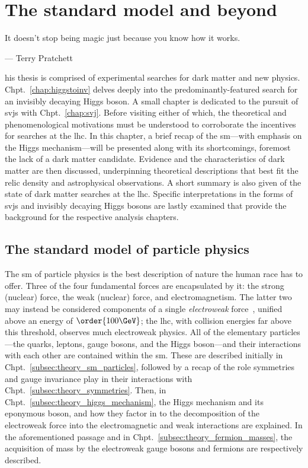 \chapter{The standard model and beyond}
\label{chap:theory}

\epigraph{It doesn’t stop being magic just because you know how it works.}{--- Terry Pratchett}

his thesis is comprised of experimental searches for dark matter and new physics. Chpt.~\ref{chap:higgstoinv} delves deeply into the predominantly-featured search for an invisibly decaying Higgs boson. A small chapter is dedicated to the pursuit of \glspl{svj} with Chpt.~\ref{chap:svj}. Before visiting either of which, the theoretical and phenomenological motivations must be understood to corroborate the incentives for searches at the \acrlong{lhc}. In this chapter, a brief recap of the \acrlong{sm}---with emphasis on the Higgs mechanism---will be presented along with its shortcomings, foremost the lack of a dark matter candidate. Evidence and the characteristics of dark matter are then discussed, underpinning theoretical descriptions that best fit the relic density and astrophysical observations. A short summary is also given of the state of dark matter searches at the \acrshort{lhc}. Specific interpretations in the forms of \glspl{svj} and invisibly decaying Higgs bosons are lastly examined that provide the background for the respective analysis chapters.




\section{The standard model of particle physics}
\label{sec:theory_standardmodel}

The \acrlong{sm} of particle physics is the best description of nature the human race has to offer. Three of the four fundamental forces are encapsulated by it: the strong (nuclear) force, the weak (nuclear) force, and electromagnetism. The latter two may instead be considered components of a single \emph{electroweak} force~\cite{GLASHOW1961579,PhysRevLett.19.1264,Salam:1968rm}, unified above an energy of $\order{\text{100}\GeV}$; the \acrshort{lhc}, with collision energies far above this threshold, observes much electroweak physics. All of the elementary particles---the quarks, leptons, gauge bosons, and the Higgs boson---and their interactions with each other are contained within the \acrlong{sm}. These are described initially in Chpt.~\ref{subsec:theory_sm_particles}, followed by a recap of the role symmetries and gauge invariance play in their interactions with Chpt.~\ref{subsec:theory_symmetries}. Then, in Chpt.~\ref{subsec:theory_higgs_mechanism}, the Higgs mechanism and its eponymous boson, and how they factor in to the decomposition of the electroweak force into the electromagnetic and weak interactions are explained. In the aforementioned passage and in Chpt.~\ref{subsec:theory_fermion_masses}, the acquisition of mass by the electroweak gauge bosons and fermions are respectively described.


